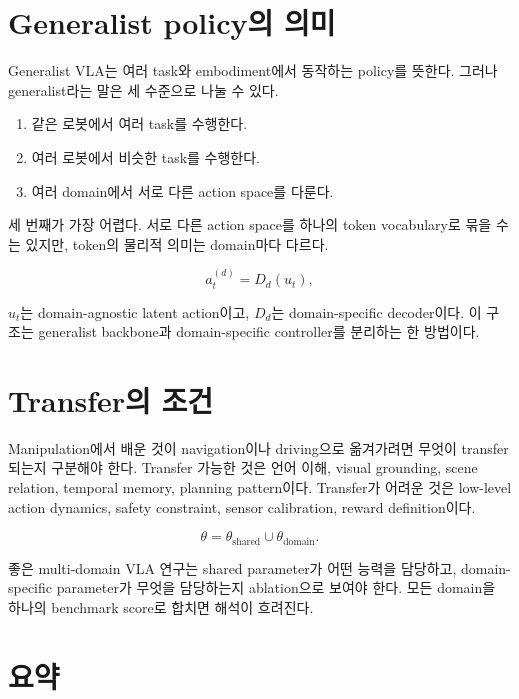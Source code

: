 \section{Generalist policy의 의미}

Generalist VLA는 여러 task와 embodiment에서 동작하는 policy를 뜻한다. 그러나 generalist라는 말은 세 수준으로 나눌 수 있다.

\begin{enumerate}
  \item 같은 로봇에서 여러 task를 수행한다.
  \item 여러 로봇에서 비슷한 task를 수행한다.
  \item 여러 domain에서 서로 다른 action space를 다룬다.
\end{enumerate}

세 번째가 가장 어렵다. 서로 다른 action space를 하나의 token vocabulary로 묶을 수는 있지만, token의 물리적 의미는 domain마다 다르다.

\begin{equation}
  a_t^{(d)}
  =
  D_d
  (u_t),
\end{equation}

$u_t$는 domain-agnostic latent action이고, $D_d$는 domain-specific decoder이다. 이 구조는 generalist backbone과 domain-specific controller를 분리하는 한 방법이다.

\section{Transfer의 조건}

Manipulation에서 배운 것이 navigation이나 driving으로 옮겨가려면 무엇이 transfer되는지 구분해야 한다. Transfer 가능한 것은 언어 이해, visual grounding, scene relation, temporal memory, planning pattern이다. Transfer가 어려운 것은 low-level action dynamics, safety constraint, sensor calibration, reward definition이다.

\begin{equation}
  \theta
  =
  \theta_{\mathrm{shared}}
  \cup
  \theta_{\mathrm{domain}}.
\end{equation}

좋은 multi-domain VLA 연구는 shared parameter가 어떤 능력을 담당하고, domain-specific parameter가 무엇을 담당하는지 ablation으로 보여야 한다. 모든 domain을 하나의 benchmark score로 합치면 해석이 흐려진다.

\section{요약}

